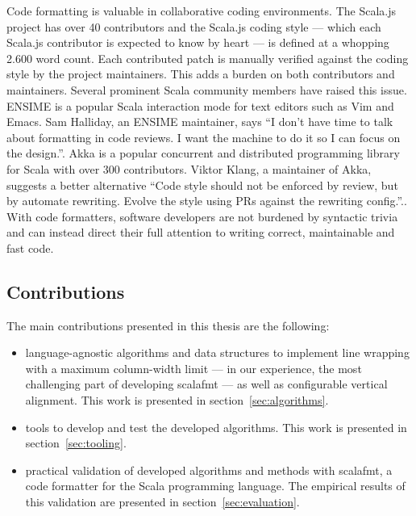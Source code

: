 Code formatting is valuable in collaborative coding environments.
The Scala.js project\autocite{_scala.js_????} has over 40 contributors and the Scala.js coding style\autocite{doeraene_scala.js_2015} --- which each Scala.js contributor is expected to know by heart --- is defined at a whopping 2.600 word count.
Each contributed patch is manually verified against the coding style by the project maintainers.
This adds a burden on both contributors and maintainers.
Several prominent Scala community members have raised this issue.
ENSIME\autocite{_ensime_????} is a popular Scala interaction mode for text editors such as Vim and Emacs.
Sam Halliday, an ENSIME maintainer, says ``I don't have time to talk about formatting in code reviews. I want the machine to do it so I can focus on the design.''\autocite{halliday_i_2016-1}.
Akka\autocite{_akka_????} is a popular concurrent and distributed programming library for Scala with over 300 contributors.
Viktor Klang, a maintainer of Akka, suggests a better alternative ``Code style should not be enforced by review, but by automate rewriting. Evolve the style using PRs against the rewriting config.''.\autocite{klang_code_2016}.
With code formatters, software developers are not burdened by syntactic trivia and can instead direct their full attention to writing correct, maintainable and fast code.

\subsection{Contributions}
The main contributions presented in this thesis are the following:
\begin{itemize}
  \item language-agnostic algorithms and data structures to implement line wrapping with a maximum column-width limit --- in our experience, the most challenging part of developing scalafmt --- as well as configurable vertical alignment.
    This work is presented in section~\ref{sec:algorithms}.
  \item tools to develop and test the developed algorithms.
    This work is presented in section~\ref{sec:tooling}.
  \item practical validation of developed algorithms and methods with scalafmt, a code formatter for the Scala programming language.
    The empirical results of this validation are presented in section~\ref{sec:evaluation}.
\end{itemize}
